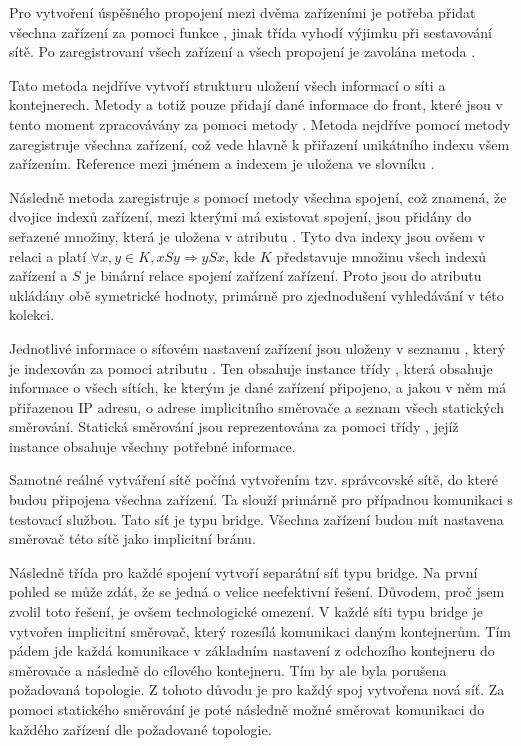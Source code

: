 Pro vytvoření úspěšného propojení mezi dvěma zařízeními je potřeba přidat všechna zařízení za pomoci funkce , jinak třída vyhodí výjimku při sestavování sítě. Po zaregistrovaní všech zařízení a všech propojení je zavolána metoda . 

Tato metoda nejdříve vytvoří strukturu uložení všech informací o síti a kontejnerech. Metody  a  totiž pouze přidají dané informace do front, které jsou v tento moment zpracovávány za pomoci metody . Metoda nejdříve pomocí metody  zaregistruje všechna zařízení, což vede hlavně k přiřazení unikátního indexu všem zařízením. Reference mezi jménem a indexem je uložena ve slovníku . 

Následně metoda zaregistruje s pomocí metody  všechna spojení, což znamená, že dvojice indexů zařízení, mezi kterými má existovat spojení, jsou přidány do seřazené množiny, která je uložena v atributu . Tyto dva indexy jsou ovšem v relaci a platí $\forall x,y \in K, xSy \Rightarrow ySx$, kde $K$ představuje množinu všech indexů zařízení a $S$ je binární relace spojení zařízení zařízení.
Proto  jsou do atributu  ukládány obě symetrické hodnoty, primárně pro zjednodušení vyhledávání v této kolekci.

Jednotlivé informace o síťovém nastavení zařízení jsou uloženy v seznamu , který je indexován za pomoci atributu . Ten obsahuje instance třídy , která obsahuje informace o všech sítích, ke kterým je dané zařízení připojeno, a jakou v něm má přiřazenou IP adresu, o adrese implicitního směrovače a seznam všech statických směrování. Statická směrování jsou reprezentována za pomoci třídy , jejíž instance obsahuje všechny potřebné informace. 

Samotné reálné vytváření sítě počíná vytvořením tzv. správcovské sítě, do které budou připojena všechna zařízení. Ta slouží primárně pro případnou komunikaci s testovací službou. Tato síť je typu bridge. Všechna zařízení budou mít nastavena směrovač této sítě jako implicitní bránu.

Následně třída pro každé spojení vytvoří separátní síť typu bridge. Na první pohled se může zdát, že se jedná o velice neefektivní řešení. Důvodem, proč jsem zvolil toto řešení, je ovšem technologické omezení. V každé síti typu bridge je vytvořen implicitní směrovač, který rozesílá komunikaci daným kontejnerům. Tím pádem jde každá komunikace v základním nastavení z odchozího kontejneru do směrovače a následně do cílového kontejneru. Tím by ale byla porušena požadovaná topologie. Z tohoto důvodu je pro každý spoj vytvořena nová síť. Za pomoci statického směrování je poté následně možné směrovat komunikaci do každého zařízení dle požadované topologie. 

